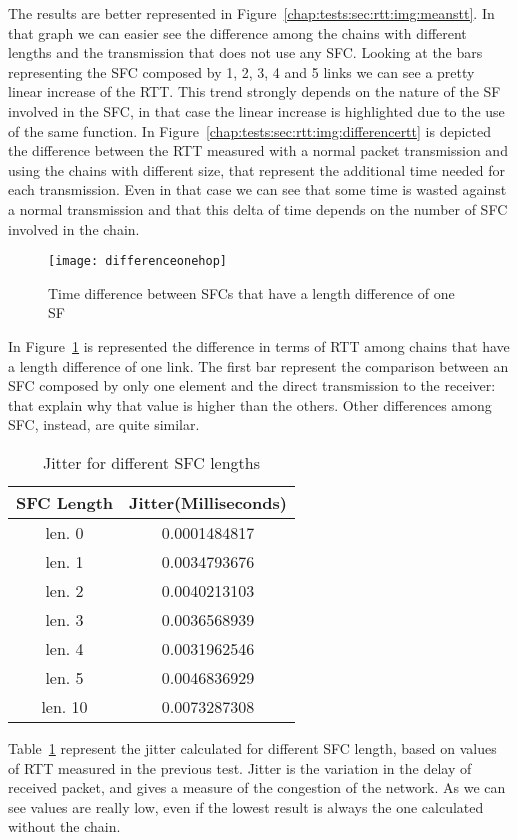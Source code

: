 The results are better represented in
Figure~\ref{chap:tests:sec:rtt:img:meanstt}. In that graph we can easier see
the difference among the chains with different lengths and the transmission that
does not use any SFC. Looking at the bars representing the SFC composed by 1,
2, 3, 4 and 5 links we can see a pretty linear increase of the RTT. This trend
strongly depends on the nature of the SF involved in the SFC, in that case the
linear increase is highlighted due to the use of the same function. In
Figure~\ref{chap:tests:sec:rtt:img:differencertt} is depicted the difference
between the RTT measured with a normal packet transmission and using the chains
with different size, that represent the additional time needed for each
transmission. Even in that case we can see that some time is wasted against a
normal transmission and that this delta of time depends on the number of SFC
involved in the chain.

\begin{figure}
  \centering
  \texttt{[image: differenceonehop]}
  \caption{Time difference between SFCs that have a length difference of one SF}
  \label{chap:tests:sec:rtt:img:differenceonehop}
\end{figure}

In Figure~\ref{chap:tests:sec:rtt:img:differenceonehop} is represented the
difference in terms of RTT among chains that have a length difference of one
link. The first bar represent the comparison between an SFC composed by only
one element and the direct transmission to the receiver: that explain why that
value is higher than the others. Other differences among SFC, instead, are
quite similar.

\begin{table}[]
\begin{tabular}{@{}cc@{}}
\toprule
\textbf{SFC Length} & \textbf{Jitter(Milliseconds)} \\ \midrule
len. 0    & 0.0001484817    \\
len. 1    & 0.0034793676    \\
len. 2    & 0.0040213103    \\
len. 3    & 0.0036568939    \\
len. 4    & 0.0031962546    \\
len. 5    & 0.0046836929    \\
len. 10   & 0.0073287308    \\ \bottomrule
\end{tabular}
\caption{Jitter for different SFC lengths}
\label{chap:tests:sec:rtt:tab:jitter}
\end{table}

Table~\ref{chap:tests:sec:rtt:tab:jitter} represent the jitter calculated for
different SFC length, based on values of RTT measured in the previous test.
Jitter is the variation in the delay of received packet, and gives a measure of
the congestion of the network. As we can see values are really low, even if the
lowest result is always the one calculated without the chain.